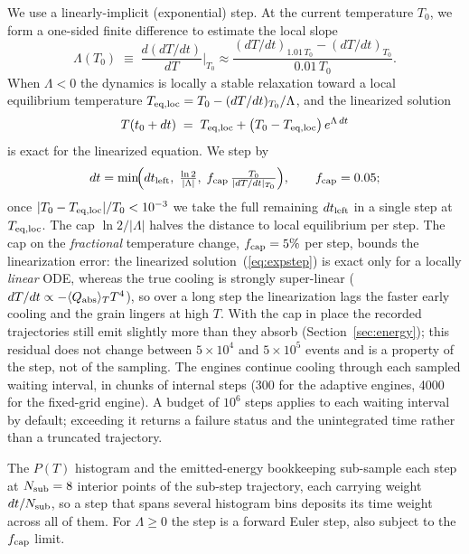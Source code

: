 \documentclass{my_memo}
\newcommand{\QplT}{\langle Q_{\rm abs} \rangle_T}
\begin{document}
We use a linearly-implicit (exponential) step.  At the current
temperature $T_0$, we form a one-sided finite difference to estimate
the local slope
\begin{equation}
\Lambda(T_0) \;\equiv\; \frac{d(dT/dt)}{dT}\bigg|_{T_0}
   \approx \frac{(dT/dt)_{1.01\,T_0} - (dT/dt)_{T_0}}{0.01\,T_0}.
\end{equation}
When $\Lambda < 0$ the dynamics is locally a stable relaxation
toward a local equilibrium temperature
$T_{\rm eq, loc} = T_0 - (dT/dt)_{T_0}/\Lambda$, and the linearized
solution
\begin{equation}\label{eq:expstep}
T(t_0 + dt) \;=\; T_{\rm eq, loc} +
   \bigl(T_0 - T_{\rm eq, loc}\bigr)\,e^{\Lambda \, dt}
\end{equation}
is exact for the linearized equation.  We step by
\begin{equation}\label{eq:stepcap}
dt = \min\!\Bigl(dt_{\rm left},\; \tfrac{\ln 2}{|\Lambda|},\;
     f_{\rm cap}\,\tfrac{T_0}{|dT/dt|_{T_0}}\Bigr),
     \qquad f_{\rm cap} = 0.05;
\end{equation}
once $|T_0 - T_{\rm eq, loc}|/T_0 < 10^{-3}$ we take the full
remaining $dt_{\rm left}$ in a single step at $T_{\rm eq,loc}$.
The cap $\ln 2 / |\Lambda|$ halves the distance to local equilibrium
per step.  The cap on the \emph{fractional} temperature change,
$f_{\rm cap}=5\%$ per step, bounds the linearization error: the
linearized solution~(\ref{eq:expstep}) is exact only for a locally
\emph{linear} ODE, whereas the true cooling is strongly super-linear
($dT/dt \propto -\QplT T^4$), so over a long step the linearization
lags the faster early cooling and the grain lingers at high $T$.
With the cap in place the recorded trajectories still emit slightly
more than they absorb (Section~\ref{sec:energy}); this residual does
not change between $5\times10^4$ and $5\times10^5$ events and is a
property of the step, not of the sampling.
The engines continue cooling through each sampled waiting interval,
in chunks of internal steps (300 for the adaptive engines, 4000 for
the fixed-grid engine). A budget of $10^6$ steps applies to each
waiting interval by default; exceeding it returns a failure status
and the unintegrated time rather than a truncated trajectory.

The $P(T)$ histogram and the emitted-energy bookkeeping sub-sample each
step at $N_{\rm sub}=8$ interior points of the sub-step trajectory,
each carrying weight $dt/N_{\rm sub}$, so a step that spans several
histogram bins deposits its time weight across all of them.
For $\Lambda \ge 0$ the step is a forward Euler step, also subject to
the $f_{\rm cap}$ limit.
\end{document}
